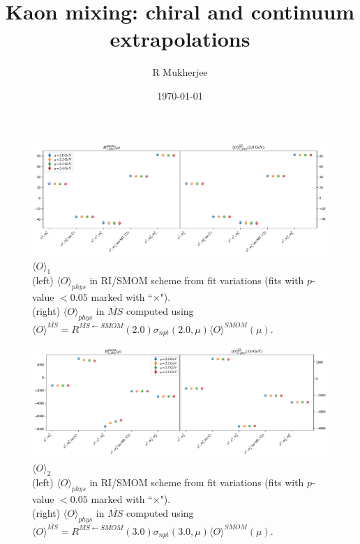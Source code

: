 \documentclass[12pt]{extarticle}
\title{Kaon mixing: chiral and continuum extrapolations}
\author{R Mukherjee}
\date{\today}
\begin{document}
\maketitle
\tableofcontents
\clearpage
\begin{figure}
\centering
\includegraphics[page=1, width=1.1\textwidth]{VVpAA/NPR/fit_summary_fq_op.pdf}
\caption{$\langle O \rangle_{1}$\\(left) $\langle O \rangle_{phys}$ in RI/SMOM scheme from fit variations (fits with $p$-value $<0.05$ marked with ``$\times$"). \\(right) $\langle O \rangle_{phys}$ in $\overline{MS}$ computed using $\langle O \rangle^{\overline{MS}} = R^{\overline{MS}\leftarrow SMOM}(2.0)\sigma_{npt}(2.0,\mu) \langle O \rangle^{SMOM}(\mu)$.}
\end{figure}
\clearpage
\begin{figure}
\centering
\includegraphics[page=1, width=1.1\textwidth]{VVmAA/NPR/fit_summary_fq_op.pdf}
\caption{$\langle O \rangle_{2}$\\(left) $\langle O \rangle_{phys}$ in RI/SMOM scheme from fit variations (fits with $p$-value $<0.05$ marked with ``$\times$"). \\(right) $\langle O \rangle_{phys}$ in $\overline{MS}$ computed using $\langle O \rangle^{\overline{MS}} = R^{\overline{MS}\leftarrow SMOM}(3.0)\sigma_{npt}(3.0,\mu) \langle O \rangle^{SMOM}(\mu)$.}
\end{figure}
\clearpage
\end{document}
